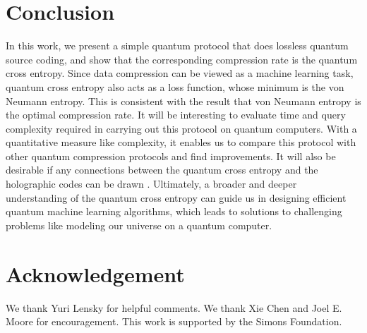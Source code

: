 \documentclass[11pt]{article}
\begin{document}
\section{Conclusion}

In this work, we present a simple quantum protocol that does lossless quantum source coding, and 
show that the corresponding compression rate is the quantum cross entropy. Since data compression can be viewed as a machine learning task, quantum cross entropy also acts as a loss function, whose minimum is the von Neumann entropy. This is consistent with the result that von Neumann entropy is the optimal compression rate.
It will be interesting to evaluate time and query complexity \cite{complexity2, complexityunitary, shangnan2019complexity, querycomplexity} required in carrying out this protocol on quantum computers. With a quantitative measure like complexity, it enables us to compare this protocol with other quantum compression protocols and find improvements. It will also be desirable if any connections between the quantum cross entropy and the holographic codes can be drawn \cite{holo1, holo2}. Ultimately, a broader and deeper understanding of the quantum cross entropy can guide us in designing efficient quantum machine learning algorithms, which leads to solutions to challenging problems like modeling our universe on a quantum computer.
















\section*{Acknowledgement}

We thank Yuri Lensky for helpful comments. We thank Xie Chen and Joel E. Moore for encouragement. This work is supported by the Simons Foundation.





\end{document}
